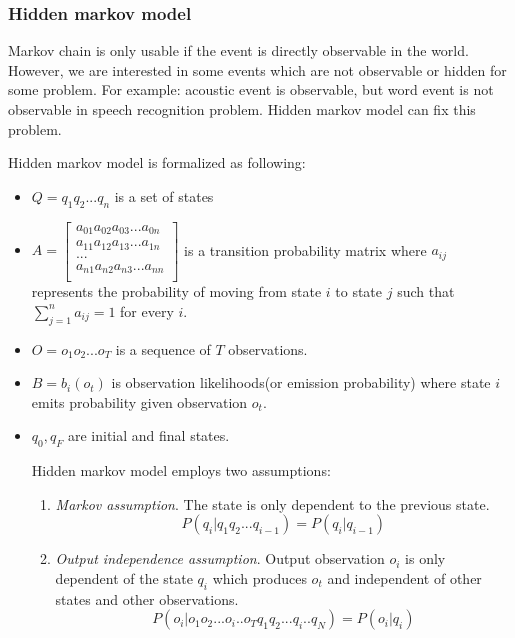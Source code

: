 \subsubsection{Hidden markov model}
\label{HMM}
Markov chain is only usable if the event is directly observable in the world. However, we are interested in some events which are not observable or hidden for some problem. For example: acoustic event is observable, but word event is not observable in speech recognition problem. Hidden markov model can fix this problem. 

Hidden markov model is formalized as following:
\begin{itemize}
\item $Q=q_{1}q_{2}...q_{n}$ is a set of states
\item  $A=
\begin{bmatrix}
a_{01}a_{02}a_{03}...a_{0n} \\
a_{11}a_{12}a_{13}...a_{1n} \\
... \\
a_{n1}a_{n2}a_{n3}...a_{nn} \\
\end{bmatrix}$ is a transition probability matrix where $a_{ij}$ represents the probability of moving from state $i$ to state $j$ such that $\sum_{j=1}^{n}  a_{ij}=1$ for every $i$.
\item $O=o_{1}o_{2}...o_{T}$ is a sequence of $T$ observations.
\item $B=b_{i}(o_{t})$ is observation likelihoods(or emission probability) where state $i$ emits probability given observation $o_{t}$. 
\item $q_{0},q_{F}$ are initial and final states.

Hidden markov model employs two assumptions:
\begin{enumerate}
\item \textit{Markov assumption}. The state is only dependent to the previous state.
\begin{equation}
P(q_{i}|q_{1}q_{2}...q_{i-1}) = P(q_{i}|q_{i-1})
\end{equation}
\item \textit{Output independence assumption}. Output observation $o_{i}$ is only dependent of the state $q_{i}$ which produces $o_{t}$ and independent of other states and other observations.
\begin{equation}
P(o_{i}|o_{1}o_{2}...o_{i}..o_{T}q_{1}q_{2}...q_{i}..q_{N}) = P(o_{i}|q_{i})
\end{equation}

\end{enumerate}

\end{itemize}  

